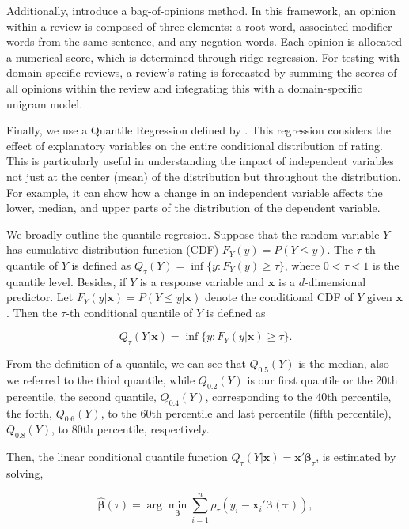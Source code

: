 \documentclass[12pt]{article}
\numberwithin{equation}{section}
\begin{document}
Additionally, \textcite{Qu}  introduce a bag-of-opinions method. In this framework, an opinion within a review is composed of three elements: a root word, associated modifier words from the same sentence, and any negation words. Each opinion is allocated a numerical score, which is determined through ridge regression. For testing with domain-specific reviews, a review's rating is forecasted by summing the scores of all opinions within the review and integrating this with a domain-specific unigram model.

Finally, we use a Quantile Regression defined by \textcite{Koenker}. This regression considers the effect of explanatory variables on the entire conditional distribution of rating. This is particularly useful in understanding the impact of independent variables not just at the center (mean) of the distribution but throughout the distribution. For example, it can show how a change in an independent variable affects the lower, median, and upper parts of the distribution of the dependent variable.

We broadly outline the quantile regresion. Suppose that the random variable \( Y \) has cumulative distribution function (CDF) \( F_Y(y) = P(Y \le y) \). The \( \tau \)-th quantile of \( Y \) is defined as \( Q_\tau(Y) = \inf\{y : F_Y(y) \geq \tau\} \), where \( 0 < \tau < 1 \) is the quantile level. Besides, if \( Y \) is a response variable and \( \mathbf{x} \) is a \( d \)-dimensional predictor. Let \( F_Y(y|\mathbf{x}) = P(Y \le y|\mathbf{x}) \) denote the conditional CDF of \( Y \) given \( \mathbf{x} \). Then the \( \tau \)-th conditional quantile of \( Y \) is defined as

\[
Q_\tau(Y|\mathbf{x}) = \inf\{y : F_Y(y|\mathbf{x}) \geq \tau\}.
\]

From the definition of a quantile, we can see that \( Q_{0.5}(Y) \) is the median, also we referred to the third quantile, while \( Q_{0.2}(Y) \) is our first quantile or the 20th percentile, the second quantile, \( Q_{0.4}(Y) \), corresponding to the 40th percentile, the forth, \( Q_{0.6}(Y) \), to the 60th percentile and last percentile (fifth percentile), \( Q_{0.8}(Y) \), to 80th percentile, respectively.

Then, the linear conditional quantile function \( Q_\tau(Y|\mathbf{x}) = \mathbf{x}'\boldsymbol{\beta}_\tau \), is estimated by solving,

\[
\hat{\boldsymbol{\beta}}(\tau) = \arg\min_{\boldsymbol{\beta}} \sum_{i=1}^n \rho_\tau(y_i - \mathbf{x}_i'\boldsymbol{\beta(\tau)}),
\]
\end{document}
